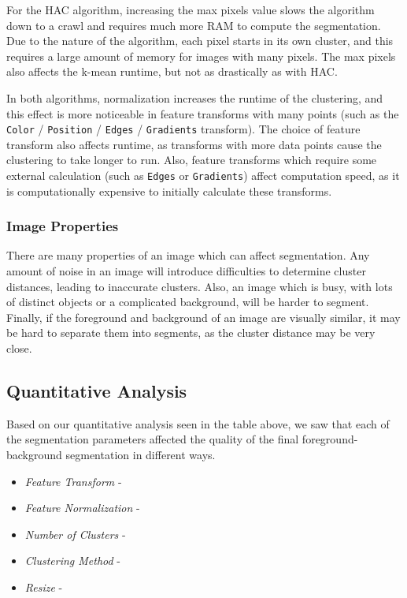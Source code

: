 \documentclass[12pt]{article}
\begin{document}
For the HAC algorithm, increasing the max pixels value slows the algorithm down to a crawl and requires much more RAM to compute the segmentation. Due to the nature of the algorithm, each pixel starts in its own cluster, and this requires a large amount of memory for images with many pixels. The max pixels also affects the k-mean runtime, but not as drastically as with HAC.

In both algorithms, normalization increases the runtime of the clustering, and this effect is more noticeable in feature transforms with many points (such as the \texttt{Color} / \texttt{Position} / \texttt{Edges} / \texttt{Gradients} transform). The choice of feature transform also affects runtime, as transforms with more data points cause the clustering to take longer to run. Also, feature transforms which require some external calculation (such as \texttt{Edges} or \texttt{Gradients}) affect computation speed, as it is computationally expensive to initially calculate these transforms.

\subsubsection{Image Properties}
	There are many properties of an image which can affect segmentation. Any amount of noise in an image will introduce difficulties to determine cluster distances, leading to inaccurate clusters. Also, an image which is busy, with lots of distinct objects or a complicated background, will be harder to segment. Finally, if the foreground and background of an image are visually similar, it may be hard to separate them into segments, as the cluster distance may be very close. 

\subsection{Quantitative Analysis}

Based on our quantitative analysis seen in the table above, we saw that each of the segmentation parameters affected the quality of the final foreground-background segmentation in different ways.

\begin{itemize}
	\item \textit{Feature Transform} - 
	\item \textit{Feature Normalization} -
	\item \textit{Number of Clusters} -
	\item \textit{Clustering Method} - 
	\item \textit{Resize} - 
\end{itemize}
\end{document}
